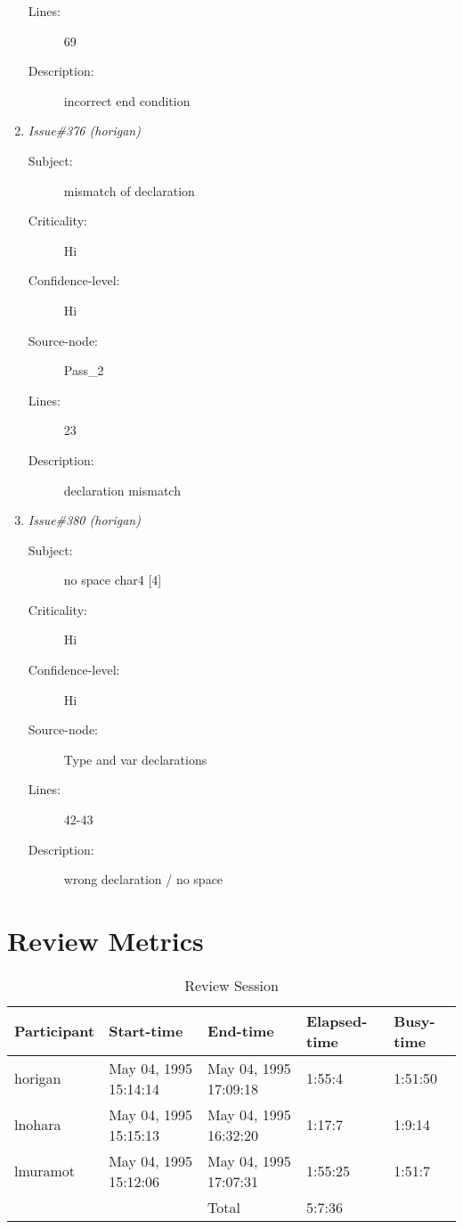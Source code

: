 \begin{enumerate}
\begin{description}
\item [Lines:] 69

\item [Description:] incorrect end condition
\end{description}
\item {\it Issue\#376 (horigan)}
\begin{description}
\item [Subject:] mismatch of declaration
\item [Criticality:] Hi
\item [Confidence-level:] Hi
\item [Source-node:] Pass\_2

\item [Lines:] 23

\item [Description:] declaration mismatch
\end{description}
\item {\it Issue\#380 (horigan)}
\begin{description}
\item [Subject:] no space char4 [4]
\item [Criticality:] Hi
\item [Confidence-level:] Hi
\item [Source-node:] Type and var declarations

\item [Lines:] 42-43

\item [Description:] wrong declaration / no space
\end{description}
\end{enumerate}
\section{Review Metrics}
\begin{table}[hb]
\begin{center}
\begin{tabular}{|l|l|l|l|l|}
\hline
Participant & Start-time & End-time & Elapsed-time & Busy-time \\
\hline
horigan & May 04, 1995 15:14:14 & May 04, 1995 17:09:18 & 1:55:4 & 1:51:50 \\
lnohara & May 04, 1995 15:15:13 & May 04, 1995 16:32:20 & 1:17:7 & 1:9:14 \\
lmuramot & May 04, 1995 15:12:06 & May 04, 1995 17:07:31 & 1:55:25 & 1:51:7 \\
\hline
 & & Total & 5:7:36 & \\
\hline
\end{tabular}
\end{center}
\caption{Review Session}
\end{table}


